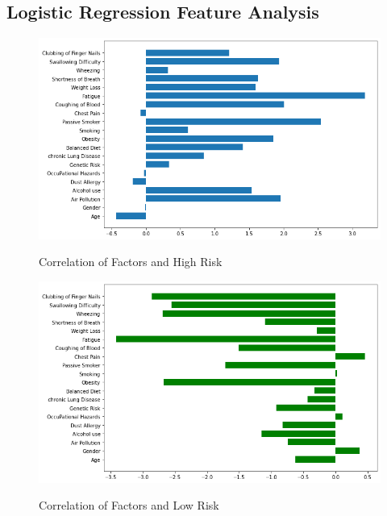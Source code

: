 \documentclass[runningheads]{llncs}
\begin{document}
\subsection{Logistic Regression Feature Analysis}

\begin{figure}[h]           	 
\centering               	 
\caption{Correlation of Factors and High Risk}
\includegraphics[scale=0.5]{fta-high.png}  	 
\label{fig:fta-high}
\end{figure}

\begin{figure}[h]           	 
\centering               	 
\caption{Correlation of Factors and Low Risk}
\includegraphics[scale=0.5]{fta-low.png}  	 
\label{fig:fta-low}
\end{figure}
\end{document}
